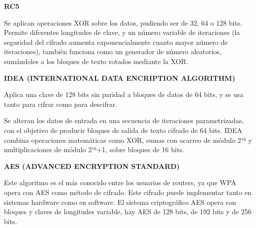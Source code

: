 \documentclass[12pt]{article}
\begin{document}
\vspace{\baselineskip}
\begin{justify}
\textbf{RC5}
\end{justify}\par


\vspace{\baselineskip}
\begin{justify}
Se aplican operaciones XOR sobre los datos, pudiendo ser de 32, 64 o 128 bits. Permite diferentes longitudes de clave, y un número variable de iteraciones (la seguridad del cifrado aumenta exponencialmente cuanto mayor número de iteraciones), también funciona como un generador de número aleatorios, sumándoles a los bloques de texto rotados mediante la XOR.
\end{justify}\par


\vspace{\baselineskip}
\begin{justify}
\textbf{IDEA (INTERNATIONAL DATA ENCRIPTION ALGORITHM)}
\end{justify}\par


\vspace{\baselineskip}
\begin{justify}
Aplica una clave de 128 bits sin paridad a bloques de datos de 64 bits, y se usa tanto para cifrar como para descifrar.
\end{justify}\par


\vspace{\baselineskip}
\begin{justify}
Se alteran los datos de entrada en una secuencia de iteraciones parametrizadas, con el objetivo de producir bloques de salida de texto cifrado de 64 bits. IDEA combina operaciones matemáticas como XOR, sumas con acarreo de módulo 2¹⁶ y multiplicaciones de módulo 2¹⁶+1, sobre bloques de 16 bits.
\end{justify}\par


\vspace{\baselineskip}
\begin{justify}
\textbf{AES (ADVANCED ENCRYPTION STANDARD)}
\end{justify}\par


\vspace{\baselineskip}
\begin{justify}
Este algoritmo es el más conocido entre los usuarios de routers, ya que WPA opera con AES como método de cifrado. Este cifrado puede implementar tanto en sistemas hardware como en software. El sistema criptográfico AES opera con bloques y claves de longitudes variable, hay AES de 128 bits, de 192 bits y de 256 bits.
\end{justify}\par
\end{document}
